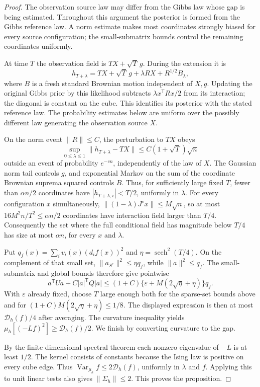 \begin{proof}
The observation source law may differ from the Gibbs law whose gap is
being estimated. Throughout this argument the posterior is formed from
the Gibbs reference law. A norm estimate makes most coordinates strongly
biased for every source configuration; the small-submatrix bounds
control the remaining coordinates uniformly.

At time $T$ the observation field is $TX+\sqrt T\,g$.
During the extension it is
\[
 h_{T+\lambda}=TX+\sqrt T\,g+\lambda RX+R^{1/2}B_\lambda,
\]
where $B$ is a fresh standard Brownian motion independent of $X,g$.
Updating the original Gibbs prior by this likelihood subtracts
$\lambda x^{\mathsf T}Rx/2$ from its interaction; the diagonal is
constant on the cube.  This identifies its posterior with the stated
reference law.  The probability estimates below are uniform over the
possibly different law generating the observation source $X$.

On the norm event $\|R\|\le C$, the perturbation to $TX$ obeys
\[
 \sup_{0\le\lambda\le1}\|h_{T+\lambda}-TX\|
 \le C(1+\sqrt T)\sqrt n
\]
outside an event of probability $e^{-cn}$, independently of the law of
$X$.  The Gaussian norm tail controls $g$, and exponential Markov on
the sum of the coordinate Brownian suprema squared controls $B$.
Thus, for sufficiently large fixed $T$, fewer than $\alpha n/2$
coordinates have $|h_{T+\lambda,i}|<T/2$, uniformly in $\lambda$.
For every configuration $x$ simultaneously,
$\|(1-\lambda)J^\circ x\|\le M\sqrt n$, so at most
$16M^2n/T^2\le\alpha n/2$ coordinates have interaction field
larger than $T/4$.  Consequently the set where the full conditional
field has magnitude below $T/4$ has size at most $\alpha n$,
for every $x$ and $\lambda$.

Put $q_f(x)=\sum_i v_i(x)(d_i f(x))^2$ and
$\eta=\operatorname{sech}^2(T/4)$.  On the complement of that small
set, $\|a_{S^c}\|^2\le\eta q_f$, while $\|a\|^2\le q_f$.
The small-submatrix and global bounds therefore give pointwise
\[
 a^{\mathsf T}Ua+C|a|^{\mathsf T}Q|a|
 \le(1+C)\{\varepsilon+M(2\sqrt\eta+\eta)\}q_f.
\]
With \(\varepsilon\) already fixed, choose \(T\) large enough
both for the sparse-set bounds above and for
\((1+C)M(2\sqrt\eta+\eta)\le1/8\). The displayed expression
is then at most \(\mathcal D_h(f)/4\) after averaging.
The curvature inequality yields
$\mu_h[(-Lf)^2]\ge\mathcal D_h(f)/2$.
We finish by converting curvature to the gap.

By the finite-dimensional
spectral theorem each nonzero eigenvalue
of $-L$ is at least $1/2$.  The kernel consists of constants because
the Ising law is positive on every cube edge.  Thus
$\operatorname{Var}_{\mu_h}f\le2\mathcal D_h(f)$, uniformly in
$\lambda$ and $f$.  Applying this to unit linear tests also gives
$\|\Sigma_h\|\le2$.  This proves the proposition.
\end{proof}

